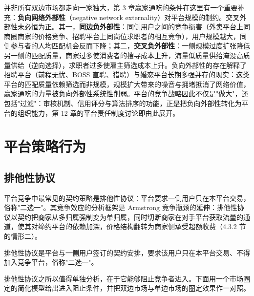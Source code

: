 并非所有双边市场都走向一家独大，第 3 章赢家通吃的条件在这里有一个重要补充：\textbf{负向网络外部性}（negative network externality）对平台规模的制约。交叉外部性未必恒为正。其一，\textbf{同边负外部性}：同侧用户之间的竞争损害（外卖平台上同商圈商家的价格竞争、招聘平台上同岗位求职者的相互竞争），用户规模越大，同侧参与者的人均匹配机会反而下降；其二，\textbf{交叉负外部性}：一侧规模过度扩张降低另一侧的匹配质量，商家过多使消费者的搜寻成本上升，海量低质量供给淹没高质量供给（逆向选择），求职者过多使雇主筛选成本上升。负向外部性的存在解释了招聘平台（前程无忧、BOSS 直聘、猎聘）与婚恋平台长期多强并存的现实：这类平台的匹配质量依赖筛选而非规模，规模扩大带来的噪音与拥堵抵消了网络价值，赢家通吃的力量被负向外部性系统性削弱。平台的竞争战略因此不仅是"做大"，还包括"过滤"：审核机制、信用评分与算法排序的功能，正是把负向外部性转化为平台的组织能力，第 12 章的平台责任制度讨论即由此展开。

\section{平台策略行为}

\subsection{排他性协议}

平台竞争中最常见的契约策略是排他性协议：平台要求一侧用户只在本平台交易，俗称"二选一"。其竞争效应的分析框架是 Armstrong 竞争瓶颈的延伸：排他性协议以契约把商家从多归属强制变为单归属，同时切断商家在对手平台获取流量的通道，使其对缔约平台的依赖加深，价格结构翻转为商家侧承受超额收费（4.3.2 节的情形二）。

\begin{definition}
排他性协议是平台与一侧用户签订的契约安排，要求该用户只在本平台交易、不得加入竞争平台，俗称"二选一"。
\end{definition}

排他性协议之所以值得单独分析，在于它能够阻止竞争者进入。下面用一个市场圈定的简化模型给出进入阻止条件，并把双边市场与单边市场的圈定效果作一对照。

